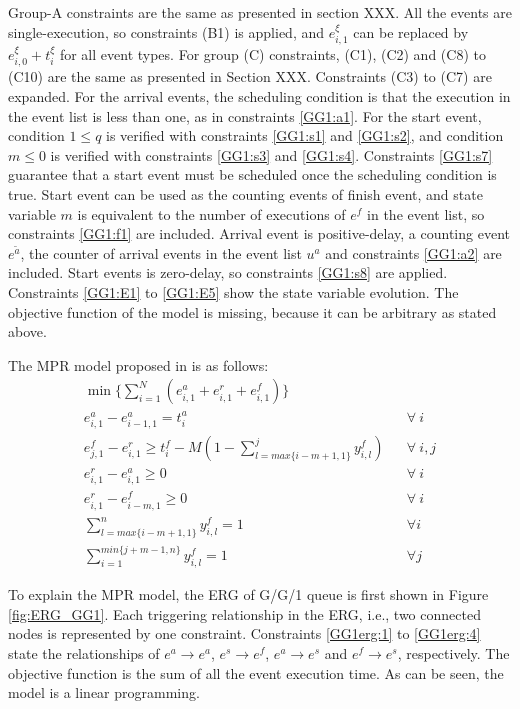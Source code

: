 \documentclass[]{interact}
\theoremstyle{plain}%
\theoremstyle{definition}
\theoremstyle{remark}
\begin{document}
Group-A constraints are the same as presented in section XXX. All the events are single-execution, so constraints (B1) is applied, and $e^{\xi}_{i,1}$ can be replaced by $e^{\xi}_{i,0}+t^{\xi}_i$ for all event types. For group (C) constraints, (C1), (C2) and (C8) to (C10) are the same as presented in Section XXX. Constraints (C3) to (C7) are expanded. For the arrival events, the scheduling condition is that the execution in the event list is less than one, as in constraints \eqref{GG1:a1}. For the start event, condition $1\le q$ is verified with constraints \eqref{GG1:s1} and \eqref{GG1:s2}, and condition $ m\le 0$ is verified with constraints \eqref{GG1:s3} and \eqref{GG1:s4}. Constraints \eqref{GG1:s7} guarantee that a start event must be scheduled once the scheduling condition is true. Start event can be used as the counting events of finish event, and state variable $m$ is equivalent to the number of executions of $e^{f}$ in the event list, so constraints \eqref{GG1:f1} are included. Arrival event is positive-delay, a counting event $e^{\tilde{a}}$, the counter of arrival events in the event list $u^a$ and constraints \eqref{GG1:a2} are included. Start events is zero-delay, so constraints \eqref{GG1:s8} are applied. Constraints \eqref{GG1:E1} to \eqref{GG1:E5} show the state variable evolution. The objective function of the model is missing, because it can be arbitrary as stated above.

The MPR model proposed in \cite{chan2008optimization} is as follows:
\begin{eqnarray}
\min\{\sum_{i=1}^N (e^{a}_{i,1}+e^{r}_{i,1}+e^{f}_{i,1})\}\nonumber\\
e^{a}_{i,1} - e^{a}_{i-1,1} = t^{a}_{i}&&\forall\ i \label{GG1erg:1}\\
e^{f}_{j,1} - e^{r}_{i,1} \ge t^{f}_{i}-M(1-\sum_{l=max\{i-m+1,1\}}^{j} y^{f}_{i,l})&&\forall\ i,j\label{GG1erg:2}\\
e^{r}_{i,1} - e^{a}_{i,1} \ge 0&&\forall\ i\label{GG1erg:3}\\
e^{r}_{i,1} - e^{f}_{i-m,1} \ge 0&&\forall\ i\label{GG1erg:4}\\
\sum_{l=max\{i-m+1,1\}}^n y^{f}_{i,l} = 1 && \forall i\\
\sum_{i=1}^{min\{j+m-1,n\}} y^{f}_{i,l} = 1 && \forall j
\end{eqnarray}

To explain the MPR model, the ERG of G/G/1 queue is first shown in Figure \ref{fig:ERG_GG1}. Each triggering relationship in the ERG, i.e., two connected nodes is represented by one constraint. Constraints \eqref{GG1erg:1} to \eqref{GG1erg:4} state the relationships of $e^a \rightarrow e^a$, $e^s\rightarrow e^f$, $e^a\rightarrow e^s$ and $e^f\rightarrow e^s$, respectively. The objective function is the sum of all the event execution time. As can be seen, the model is a linear programming. 
\end{document}
